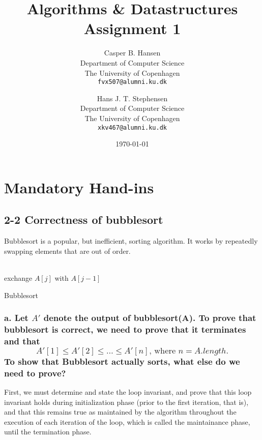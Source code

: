 \documentclass[11pt,english]{article}
\title
{
	\vspace{1in}
	Algorithms \& Datastructures\\
	\huge Assignment 1
}
\author
{
	Casper B. Hansen\\
	\small Department of Computer Science\\
	\small The University of Copenhagen\\
	\texttt{fvx507@alumni.ku.dk}
	\and
	Hans J. T. Stephensen\\
	\small Department of Computer Science\\
	\small The University of Copenhagen\\
	\texttt{xkv467@alumni.ku.dk}
}
\date{\today}
\begin{document}
\clearpage
\maketitle
\thispagestyle{empty}


\newpage
\pagestyle{fancy}

\section*{Mandatory Hand-ins}

\subsection*{2-2 Correctness of bubblesort}
Bubblesort is a popular, but inefficient, sorting algorithm. It works by
repeatedly swapping elements that are out of order.
\\\\
\begin{algorithm}[H]
	
	\BlankLine
	{
		{
			{
				exchange $A[j]$ with $A[j-1]$
			}
		}
	}
	\caption{Bubblesort}
\end{algorithm}

\subsubsection*{\large a. \mdseries Let $A'$ denote the output of bubblesort(A). To
prove that bubblesort is correct, we need to prove that it terminates and that
\[A'[1] \leq A'[2] \leq \dots \leq A'[n]\text{, where $n = A.length$.}\] To
show that Bubblesort actually sorts, what else do we need to prove?}
First, we must determine and state the loop invariant, and prove that this
loop invariant holds during initialization phase (prior to the first iteration,
that is), and that this remains true as maintained by the algorithm throughout
the execution of each iteration of the loop, which is called the maintainance
phase, until the termination phase.
\end{document}
